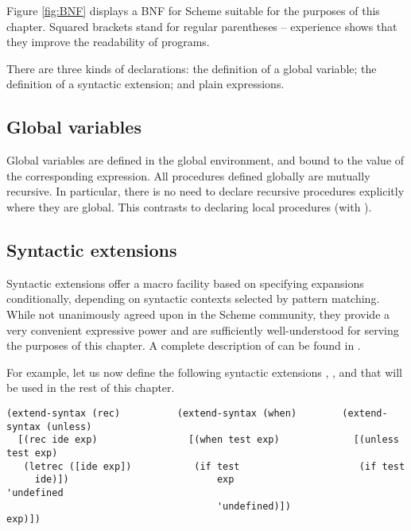 Figure \ref{fig:BNF} displays a BNF for Scheme suitable for the
purposes of this chapter.  Squared brackets stand for regular
parentheses -- experience shows that they improve the readability of
programs.



There are three kinds of declarations: the definition of a global
variable; the definition of a syntactic extension; and plain
expressions.


\subsection{Global variables}

Global variables are defined in the global environment, and bound to
the value of the corresponding expression.  All procedures defined
globally are mutually recursive.  In particular, there is no need to
declare recursive procedures explicitly where they are global.  This
contrasts to declaring local procedures (with ).


\subsection{Syntactic extensions}

Syntactic extensions offer a macro facility based on specifying
expansions conditionally, depending on syntactic contexts selected by
pattern matching.  While not unanimously agreed upon in the Scheme
community, they provide a very convenient expressive power and are
sufficiently well-understood for serving the purposes of this chapter.
A complete description of  can be found in
\cite{dyb,Koh}.

For example, let us now define the following syntactic extensions
, , and  that will be used in the
rest of this chapter.

\begin{verbatim}
(extend-syntax (rec)          (extend-syntax (when)        (extend-syntax (unless)
  [(rec ide exp)                [(when test exp)             [(unless test exp)   
   (letrec ([ide exp])           (if test                     (if test            
     ide)])                          exp                          'undefined      
                                     'undefined)])                exp)])          
\end{verbatim}

